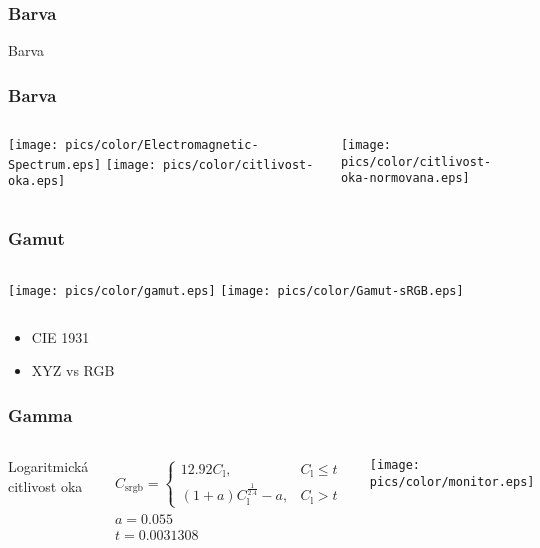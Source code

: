 \begin{frame}
\frametitle{Barva}
\begin{center}
\Huge {\color{white}Barva}
\end{center}
\end{frame}


\begin{frame}
    \frametitle{Barva}
    \begin{columns}[c]
        \texttt{[image: pics/color/Electromagnetic-Spectrum.eps]}
        \texttt{[image: pics/color/citlivost-oka.eps]}

        \texttt{[image: pics/color/citlivost-oka-normovana.eps]}
    \end{columns}
\end{frame}

\begin{frame}
    \frametitle{Gamut}
    \begin{columns}[c]
        \texttt{[image: pics/color/gamut.eps]}
        \texttt{[image: pics/color/Gamut-sRGB.eps]}
    \end{columns}
    \vfill
    \begin{itemize}
        \item CIE 1931
        \item XYZ vs RGB
    \end{itemize}
\end{frame}

\begin{frame}
    \frametitle{Gamma}

    \begin{columns}[c]
        Logaritmická citlivost oka

        \begin{eqnarray*}
        C_\mathrm{srgb}=\begin{cases}
        12.92C_\mathrm{l}, & C_\mathrm{l} \le t\\
        (1+a)C_\mathrm{l}^{\frac{1}{2.4}}-a, & C_\mathrm{l} > t
        \end{cases} \\
        a = 0.055 \\
        t = 0.0031308
        \end{eqnarray*}
        
        \texttt{[image: pics/color/monitor.eps]}
    \end{columns}
\end{frame}

